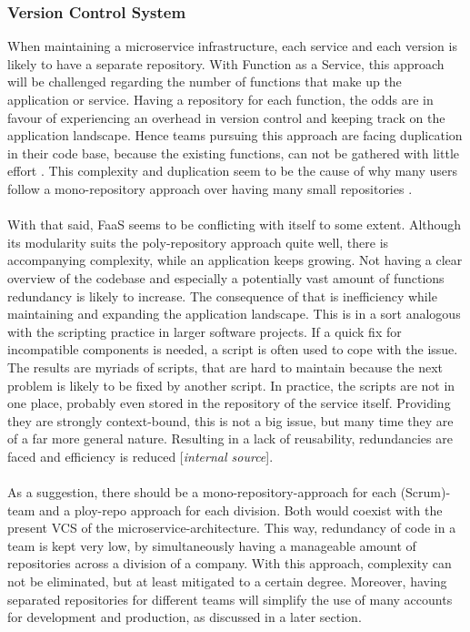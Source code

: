 \documentclass[a4paper,11pt, pagesize]{scrartcl}
\begin{document}
\begin{spacing}{1.2}
\subsubsection{Version Control System}When maintaining a microservice infrastructure, each service and each version is likely to have a separate repository. With Function as a Service, this approach will be challenged regarding the number of functions that make up the application or service. Having a repository for each function, the odds are in favour of experiencing an overhead in version control and keeping track on the application landscape. Hence teams pursuing this approach are facing duplication in their code base, because the existing functions, can not be gathered with little effort \cite{racicot2019quality}. This complexity and duplication seem to be the cause of why many users follow a mono-repository approach over having many small repositories \cite{brousse2019issue}.\\\\ With that said, FaaS seems to be conflicting with itself to some extent. Although its modularity suits the poly-repository approach quite well, there is accompanying complexity, while an application keeps growing. Not having a clear overview of the codebase and especially a potentially vast amount of functions redundancy is likely to increase. The consequence of that is inefficiency while maintaining and expanding the application landscape. This is in a sort analogous with the scripting practice in larger software projects. If a quick fix for incompatible components is needed, a script is often used to cope with the issue. The results are myriads of scripts, that are hard to maintain because the next problem is likely to be fixed by another script. In practice, the scripts are not in one place, probably even stored in the repository of the service itself. Providing they are strongly context-bound, this is not a big issue, but many time they are of a far more general nature. Resulting in a lack of reusability, redundancies are faced and efficiency is reduced [\textit{internal source}].\\\\ As a suggestion, there should be a mono-repository-approach for each (Scrum)-team and a ploy-repo approach for each division. Both would coexist with the present VCS of the microservice-architecture. This way, redundancy of code in a team is kept very low, by simultaneously having a manageable amount of repositories across a division of a company. With this approach, complexity can not be eliminated, but at least mitigated to a certain degree. Moreover, having separated repositories for different teams will simplify the use of many accounts for development and production, as discussed in a later section.\\\\ 

\end{spacing}
\end{document}
